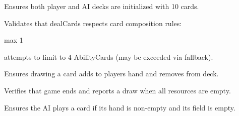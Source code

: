 \begin{DoxyRefList}
%
Ensures both player and AI decks are initialized with 10 cards.  
\item[Member \doxylink{group__GameManagerTests_ga50cc8471d616c584617d62c2117c7d86}{TEST\+\_\+F} (\doxylink{classGameManagerTest}{Game\+Manager\+Test}, Deal\+Cards\+Check\+Limits)]\label{test__test000009}%
%
Validates that deal\+Cards respects card composition rules\+:
\begin{DoxyItemize}
\item max 1 
\item attempts to limit to 4 Ability\+Cards (may be exceeded via fallback).  
\end{DoxyItemize}
\item[Member \doxylink{group__GameManagerTests_ga988d7ec0db3be3f235d4a1f391742bff}{TEST\+\_\+F} (\doxylink{classGameManagerTest}{Game\+Manager\+Test}, Draw\+Card\+For\+Player)]\label{test__test000010}%
%
Ensures drawing a card adds to player\textquotesingle{}s hand and removes from deck.  
\item[Member \doxylink{group__GameManagerTests_ga015e4677128b17eba05dbc26dcd26e57}{TEST\+\_\+F} (\doxylink{classGameManagerTest}{Game\+Manager\+Test}, Check\+Game\+Over\+And\+Determine\+Winner\+Empty)]\label{test__test000011}%
%
Verifies that game ends and reports a draw when all resources are empty.  
\item[Member \doxylink{group__GameManagerTests_gab82cd0a31c92851059ab9b62151cad95}{TEST\+\_\+F} (\doxylink{classGameManagerTest}{Game\+Manager\+Test}, Ai\+Make\+Move\+Non\+Empty\+Hand)]\label{test__test000012}%
%
Ensures the AI plays a card if its hand is non-\/empty and its field is empty. 
\end{DoxyRefList}